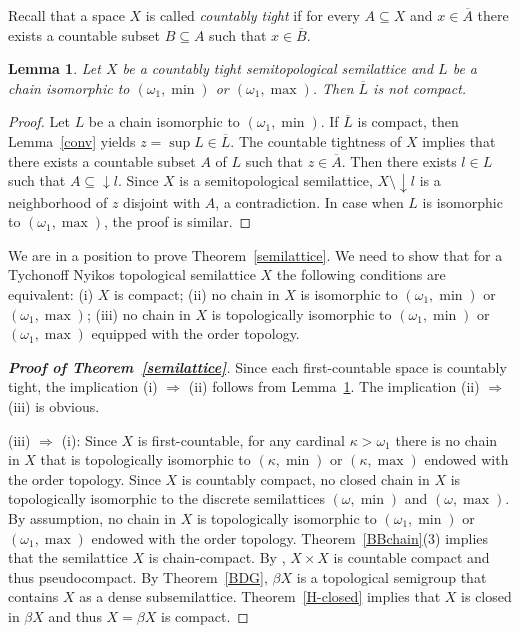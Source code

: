 \documentclass[12pt, twoside, leqno]{article}
\newtheorem{lemma}[theorem]{Lemma}
\theoremstyle{definition}
\numberwithin{equation}{section}
\newcommand{\w}{\omega}
\begin{document}
Recall that a space $X$ is called {\em countably tight} if for every $A\subseteq X$ and $x\in\overline A$ there exists a countable subset $B\subseteq A$ such that $x\in\overline B$. 


\begin{lemma}\label{base}
Let $X$ be a countably tight semitopological semilattice and $L$ be a chain isomorphic to $(\w_1,\min)$ or $(\w_1,\max)$. Then $\overline{L}$ is not compact.
\end{lemma}

\begin{proof}
Let $L$ be a chain isomorphic to $(\w_1,\min)$. If $\overline{L}$ is compact, then Lemma~\ref{conv} yields $z=\sup L\in\overline{L}$. The countable tightness of $X$ implies that there exists a countable subset $A$ of $L$ such that $z\in\overline{A}$. Then there exists $l\in L$ such that $A\subseteq {\downarrow} l$. Since $X$ is a semitopological semilattice, $X\setminus {\downarrow}l$ is a neighborhood of $z$ disjoint with $A$, a contradiction. 
In case when $L$ is isomorphic to $(\w_1,\max)$, the proof is similar.
\end{proof}

We are in a position to prove Theorem~\ref{semilattice}. We need to show that for a Tychonoff Nyikos topological semilattice $X$ the following conditions are equivalent: (i) $X$ is compact; (ii) no chain in $X$ is isomorphic to $(\w_1,\min)$ or $(\w_1,\max)$; (iii) no chain in $X$ is topologically isomorphic to $(\w_1,\min)$ or $(\w_1,\max)$ equipped with the order topology. 

\begin{proof}[{\bf Proof of Theorem~\ref{semilattice}}]
Since each first-countable space is countably tight, the implication (i) $\Rightarrow$ (ii) follows from Lemma~\ref{base}. The implication (ii) $\Rightarrow$ (iii) is obvious.


(iii) $\Rightarrow$ (i): Since $X$ is first-countable, for any cardinal $\kappa>\w_1$ there is no chain in $X$ that is topologically isomorphic to $(\kappa,\min)$ or $(\kappa,\max)$ endowed with the order topology. Since $X$ is countably compact, no closed chain in $X$ is topologically isomorphic to the discrete semilattices $(\w,\min)$ and $(\w,\max)$. By assumption, no chain in $X$ is topologically isomorphic to $(\w_1,\min)$ or $(\w_1,\max)$ endowed with the order topology. Theorem~\ref{BBchain}(3) implies that the semilattice $X$ is chain-compact. By \cite[Corollary 3.10.15]{Eng}, $X{\times}X$ is countable compact and thus pseudocompact. By Theorem~\ref{BDG}, $\beta X$ is a topological semigroup that contains $X$ as a dense subsemilattice. Theorem~\ref{H-closed} implies that $X$ is closed in $\beta X$ and thus $X=\beta X$ is compact.   
\end{proof}
\end{document}

